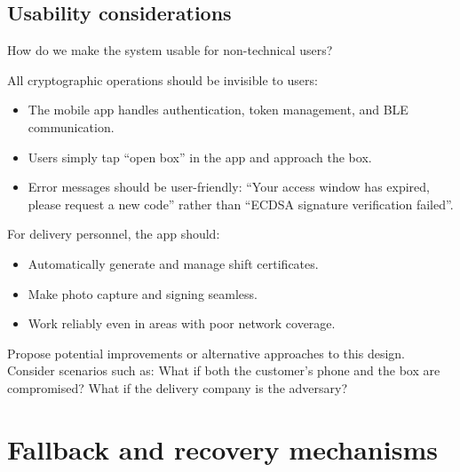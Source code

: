 \subsection{Usability considerations}

\begin{exercise}
  How do we make the system usable for non-technical users?
\end{exercise}

All cryptographic operations should be invisible to users:
\begin{itemize}
  \item The mobile app handles authentication, token management, and
    BLE communication.
  \item Users simply tap \enquote{open box} in the app and approach the box.
  \item Error messages should be user-friendly: \enquote{Your access
    window has expired, please request a new code} rather than
    \enquote{ECDSA signature verification failed}.
\end{itemize}

For delivery personnel, the app should:
\begin{itemize}
  \item Automatically generate and manage shift certificates.
  \item Make photo capture and signing seamless.
  \item Work reliably even in areas with poor network coverage.
\end{itemize}

\begin{exercise}
  Propose potential improvements or alternative approaches to this design.
  Consider scenarios such as: What if both the customer's phone and the
  box are compromised? What if the delivery company is the adversary?
\end{exercise}


\section{Fallback and recovery mechanisms}\label{FallbackMechanisms}


